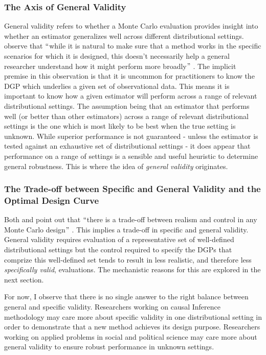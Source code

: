 \documentclass[../main.tex]{subfiles}
\begin{document}
\subsubsection{The Axis of General Validity}

General validity refers to whether a Monte Carlo evaluation provides insight into whether an estimator generalizes well across different distributional settings. \textcite{Dorie2019Automated1} observe that $``$while it is natural to make sure that a method works in the specific scenarios for which it is designed, this doesn’t necessarily help a general researcher understand how it might perform more broadly$"$ . The implicit premise in this observation is that it is uncommon for practitioners to know the DGP which underlies a given set of observational data. This means it is important to know how a given estimator will perform across a range of relevant distributional settings. The assumption being that an estimator that performs well (or better than other estimators) across a range of relevant distributional settings is the one which is most likely to be best when the true setting is unknown. While superior performance is not guaranteed - unless the estimator is tested against an exhaustive set of distributional settings - it does appear that performance on a range of settings is a sensible and useful heuristic to determine general robustness. This is where the idea of \textit{general validity }originates.\par

\subsubsection{The Trade-off between Specific and General Validity and the Optimal Design Curve}

Both \textcite{Paxton2001MonteImplementation} and \textcite{Wendling2018ComparingDatabases} point out that $``$there is a trade-off between realism and control in any Monte Carlo design$"$ \parencite{Paxton2001MonteImplementation}. This implies a trade-off in specific and general validity. General validity requires evaluation of a representative set of well-defined distributional settings but the control required to specify the DGPs that comprize this well-defined set tends to result in less realistic, and therefore less \textit{specifically valid}, evaluations. The mechanistic reasons for this are explored in the next section.\par


\vspace{\baselineskip}
For now, I observe that there is no single answer to the right balance between general and specific validity. Researchers working on causal Inference methodology may care more about specific validity in one distributional setting in order to demonstrate that a new method achieves its design purpose. Researchers working on applied problems in social and political science may care more about general validity to ensure robust performance in unknown settings.\par
\end{document}

